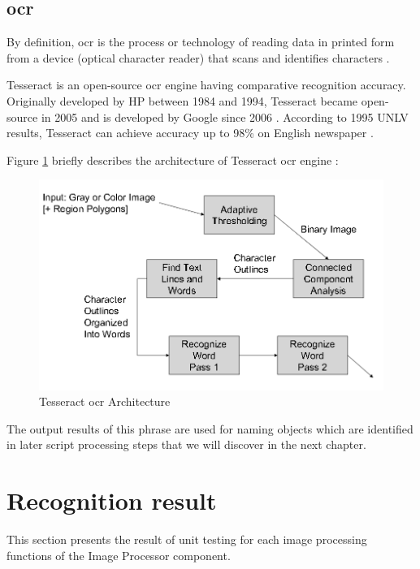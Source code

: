 \subsection{\acrlong{ocr}}
\label{sec:ocr}
By definition, \acrfull{ocr} is the process or technology of reading data in printed form from a device (optical character reader) that scans and identifies characters \cite{ocr_def}.

Tesseract is an open-source \acrshort{ocr} engine having comparative recognition accuracy. Originally developed by HP between 1984 and 1994, Tesseract became open-source in 2005 and is developed by Google since 2006 \cite{ocr_overview}. According to 1995 UNLV results, Tesseract can achieve accuracy up to 98\% on English newspaper \cite{Rice_thefourth}.

Figure \ref{fig:tesseract_arch} briefly describes the architecture of Tesseract \acrshort{ocr} engine \cite{tesseract_oscon}:

	\begin{figure}[H]
		\centering
		\includegraphics[scale=0.5]{Chapters/Fig/tesseract_arch.png}
		\caption{Tesseract \acrshort{ocr} Architecture}
		\label{fig:tesseract_arch}
	\end{figure}

The output results of this phrase are used for naming objects which are identified in later script processing steps that we will discover in the next chapter.

\section{Recognition result}
This section presents the result of unit testing for each image processing functions of the Image Processor component.

